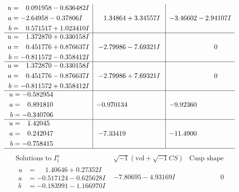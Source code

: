 \documentclass[1p]{elsarticle_modified}
\theoremstyle{definition}
\newcommand{\I}{\sqrt{-1}}
\begin{document}
$$\begin{array}{c|c|c}
\begin{aligned}
u &= \phantom{-}0.091958 - 0.636482 I \\
a &= -2.64958 - 0.37806 I \\
b &= \phantom{-}0.571517 + 1.023410 I\end{aligned}
 & \phantom{-}1.34864 + 3.34557 I & -3.46602 - 2.94107 I \\ \hline\begin{aligned}
u &= \phantom{-}1.372870 + 0.330158 I \\
a &= \phantom{-}0.451776 + 0.876637 I \\
b &= -0.811572 - 0.358412 I\end{aligned}
 & -2.79986 - 7.69321 I & \phantom{-0.000000 } 0 \\ \hline\begin{aligned}
u &= \phantom{-}1.372870 - 0.330158 I \\
a &= \phantom{-}0.451776 - 0.876637 I \\
b &= -0.811572 + 0.358412 I\end{aligned}
 & -2.79986 + 7.69321 I & \phantom{-0.000000 } 0 \\ \hline\begin{aligned}
u &= -0.582954\phantom{ +0.000000I} \\
a &= \phantom{-}0.891810\phantom{ +0.000000I} \\
b &= -0.340706\phantom{ +0.000000I}\end{aligned}
 & -0.970134\phantom{ +0.000000I} & -9.92360\phantom{ +0.000000I} \\ \hline\begin{aligned}
u &= \phantom{-}1.42045\phantom{ +0.000000I} \\
a &= \phantom{-}0.242047\phantom{ +0.000000I} \\
b &= -0.758415\phantom{ +0.000000I}\end{aligned}
 & -7.33419\phantom{ +0.000000I} & -11.4900\phantom{ +0.000000I}\\
 \hline 
 \end{array}$$\newpage$$\begin{array}{c|c|c}  
\text{Solutions to }I^u_{1}& \I (\text{vol} + \sqrt{-1}CS) & \text{Cusp shape}\\
 \hline 
\begin{aligned}
u &= \phantom{-}1.40646 + 0.27352 I \\
a &= -0.517124 - 0.625628 I \\
b &= -0.183991 - 1.166970 I\end{aligned}
 & -7.80695 - 4.93169 I & \phantom{-0.000000 } 0 \\ \hline\begin{aligned}

\end{aligned}
\end{array}$$
\end{document}
